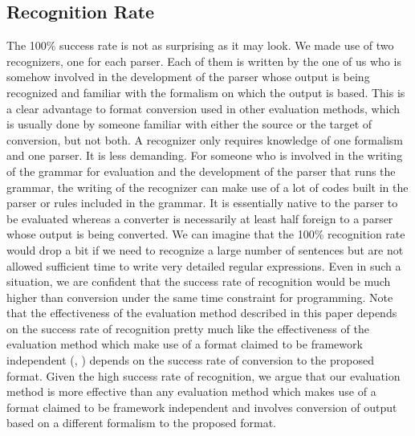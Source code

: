 \documentclass[11pt]{article}
\begin{document}
\subsection{Recognition Rate}
The 100\% success rate is not as surprising as it may look. We made use of two recognizers, one for each parser. Each of them is written by the one of us who is somehow involved in the development of the parser whose output is being recognized and familiar with the formalism on which the output is based. This is a clear advantage to format conversion used in other evaluation methods, which is usually done by someone familiar with either the source or the target of conversion, but not both. A recognizer only requires knowledge of one formalism and one parser. It is less demanding. For someone who is involved in the writing of the grammar for evaluation and the development of the parser that runs the grammar, the writing of the recognizer can make use of a lot of codes built in the parser or rules included in the grammar. It is essentially native to the parser to be evaluated whereas a converter is necessarily at least half foreign to a parser whose output is being converted. We can imagine that the 100\% recognition rate would drop a bit if we need to recognize a large number of sentences but are not allowed sufficient time to write very detailed regular expressions. Even in such a situation, we are confident that the success rate of recognition would be much higher than conversion under the same time constraint for programming. Note that the effectiveness of the evaluation method described in this paper depends on the success rate of recognition pretty much like the effectiveness of the evaluation method which make use of a format claimed to be framework independent (\cite{briscodandcarrollandwatson2006}, \cite{demarneffeandmaccartneyandmanning2006}) depends on the success rate of conversion to the proposed format. Given the high success rate of recognition, we argue that our evaluation method is more effective than any evaluation method which makes use of a format claimed to be framework independent and involves conversion of output based on a different formalism to the proposed format. 
\end{document}
